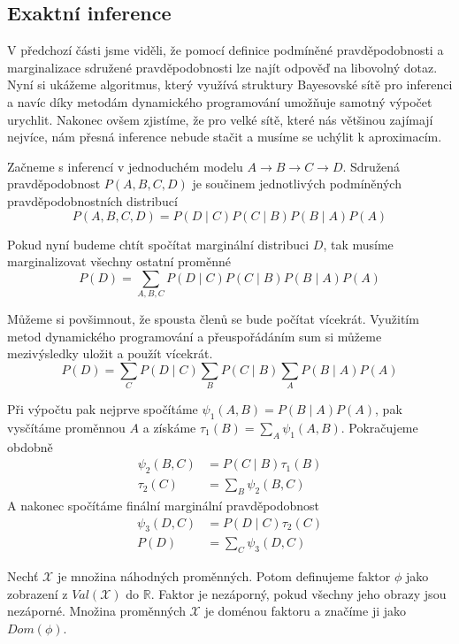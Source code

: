 \subsection{Exaktní inference}

V předchozí části jsme viděli, že pomocí definice podmíněné pravděpodobnosti a marginalizace sdružené pravděpodobnosti lze najít odpověď na libovolný dotaz. 
Nyní si ukážeme algoritmus, který využívá struktury Bayesovské sítě pro inferenci a navíc díky metodám dynamického programování umožňuje samotný výpočet urychlit.
Nakonec ovšem zjistíme, že pro velké sítě, které nás většinou zajímají nejvíce, nám přesná inference nebude stačit a musíme se uchýlit k aproximacím.

Začneme s inferencí v jednoduchém modelu $A \rightarrow B \rightarrow C \rightarrow D$.
Sdružená pravděpodobnost $P(A, B, C, D)$ je součinem jednotlivých podmíněných pravděpodobnostních distribucí
\begin{equation}
P(A, B, C, D) = P(D \mid C) P(C \mid B) P(B \mid A) P(A)
\end{equation}

Pokud nyní budeme chtít spočítat marginální distribuci $D$, tak musíme marginalizovat všechny ostatní proměnné
\begin{equation}
P(D) = \sum_{A, B, C} P(D \mid C) P(C \mid B) P(B \mid A) P(A)
\end{equation}

Můžeme si povšimnout, že spousta členů se bude počítat vícekrát.
Využitím metod dynamického programování a přeuspořádáním sum si můžeme mezivýsledky uložit a použít vícekrát.
\begin{equation}
P(D) = \sum_C P(D \mid C) \sum_B P(C \mid B) \sum_A P(B \mid A) P(A)
\end{equation}

Při výpočtu pak nejprve spočítáme $\psi_1(A, B) =  P(B \mid A) P(A)$,  pak vysčítáme proměnnou $A$ a získáme $\tau_1(B) = \sum_A \psi_1(A, B)$.
Pokračujeme obdobně
\begin{align}
    \psi_2(B, C) &= P(C \mid B) \tau_1(B) \\
    \tau_2(C) &= \sum_B \psi_2(B, C)
\end{align}
A nakonec spočítáme finální marginální pravděpodobnost
\begin{align}
    \psi_3(D, C) &= P(D \mid C) \tau_2(C) \\
    P(D) &= \sum_C \psi_3(D, C)
\end{align}

\begin{definice}
Nechť $\mathcal{X}$ je množina náhodných proměnných. 
Potom definujeme faktor $\phi$ jako zobrazení z $Val(\mathcal{X})$ do $\mathbb{R}$. Faktor je nezáporný, pokud všechny jeho obrazy jsou nezáporné. Množina proměnných $\mathcal{X}$ je doménou faktoru a značíme ji jako $Dom(\phi)$.
\end{definice}

